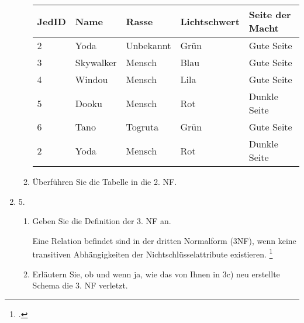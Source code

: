 \documentclass{bschlangaul-aufgabe}
\begin{document}
\begin{enumerate}
\begin{enumerate}
\begin{center}
\begin{tabular}{|l|l|l|l|l|}
\hline
JedID & Name      & Rasse     & Lichtschwert & Seite der Macht\\\hline\hline
2     & Yoda      & Unbekannt & Grün         & Gute Seite\\\hline
3     & Skywalker & Mensch    & Blau         & Gute Seite\\\hline
4     & Windou    & Mensch    & Lila         & Gute Seite\\\hline
5     & Dooku     & Mensch    & Rot          & Dunkle Seite\\\hline
6     & Tano      & Togruta   & Grün         & Gute Seite\\\hline
2     & Yoda      & Mensch    & Rot          & Dunkle Seite\\\hline
\end{tabular}
\end{center}


\item Überführen Sie die Tabelle in die 2. NF.
\end{enumerate}


\item 5.

\begin{enumerate}


\item Geben Sie die Definition der 3. NF an.

\begin{liAntwort}
Eine Relation befindet sind in der dritten Normalform (3NF), wenn keine
transitiven Abhängigkeiten der Nichtschlüsselattribute existieren.
\footcite[Seite 449]{schneider}
\end{liAntwort}


\item Erläutern Sie, ob und wenn ja, wie das von Ihnen in 3c) neu
erstellte Schema die 3. NF verletzt.

\end{enumerate}
\end{enumerate}
\end{document}
